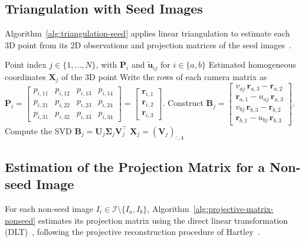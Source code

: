 \documentclass[11pt,a4paper]{article}
\begin{document}
\subsection{Triangulation with Seed Images}

Algorithm~\ref{alg:triangulation-seed} applies linear triangulation to estimate each 3D point from its 2D observations and projection matrices of the seed images~\cite[Sec.~12.2]{hartley2004mvg}.

\begin{algorithm}[htbp]
  \caption{Triangulation with Seed Images}
  \label{alg:triangulation-seed}
  \begin{algorithmic}[1]
    \Require Point index \(j \in \{1, \dots, N\}\), with \(\mathbf P_i\) and \(\tilde{\mathbf u}_{ij}\) for \(i \in \{a, b\}\)
    \Ensure Estimated homogeneous coordinates \(\mathbf X_j\) of the 3D point
    \State Write the rows of each camera matrix as \(
\mathbf P_i =
\begin{bmatrix}
p_{i,11} & p_{i,12} & p_{i,13} & p_{i,14} \\
p_{i,21} & p_{i,22} & p_{i,23} & p_{i,24} \\
p_{i,31} & p_{i,32} & p_{i,33} & p_{i,34}
\end{bmatrix}
=
\begin{bmatrix}
\mathbf r_{i,1} \\
\mathbf r_{i,2} \\
\mathbf r_{i,3}
\end{bmatrix}.
\)
    \State Construct \(
\mathbf B_j =
\begin{bmatrix}
v_{aj}\,\mathbf r_{a,3} - \mathbf r_{a,2} \\
\mathbf r_{a,1} - u_{aj}\,\mathbf r_{a,3} \\
v_{bj}\,\mathbf r_{b,3} - \mathbf r_{b,2} \\
\mathbf r_{b,1} - u_{bj}\,\mathbf r_{b,3}
\end{bmatrix}.
\)
    \State Compute the SVD \(\mathbf B_j = \mathbf{U}_j\boldsymbol{\Sigma}_j\mathbf{V}_j^\top\)
    \State \Return \(\mathbf{X}_j = (\mathbf V_j)_{:,4}\)
  \end{algorithmic}
\end{algorithm}

\subsection{Estimation of the Projection Matrix for a Non-seed Image}

For each non-seed image \(I_i \in \mathcal{I} \setminus \{I_a, I_b\}\), Algorithm~\ref{alg:projective-matrix-nonseed} estimates its projection matrix using the direct linear transformation (DLT)~\cite[Sec.~7.1]{hartley2004mvg}, following the projective reconstruction procedure of Hartley~\cite[Sec.~6]{hartley1994euclidean}.
\end{document}
